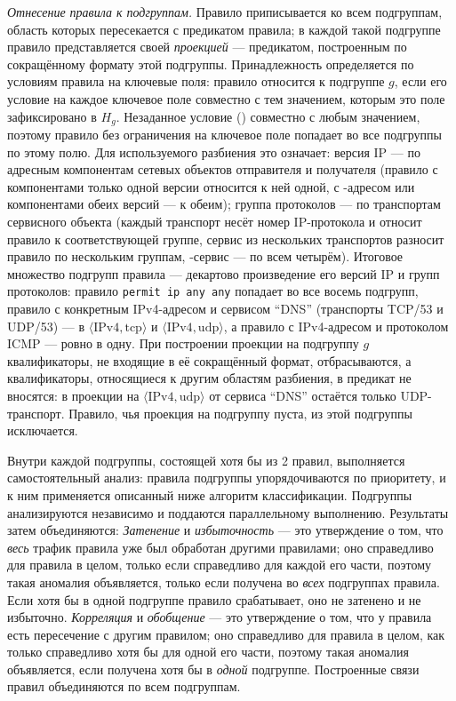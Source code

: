 \emph{Отнесение правила к подгруппам.} Правило приписывается ко всем подгруппам, область которых пересекается с предикатом правила; в каждой такой подгруппе правило представляется своей \emph{проекцией} --- предикатом, построенным по сокращённому формату этой подгруппы. Принадлежность определяется по условиям правила на ключевые поля: правило относится к подгруппе $g$, если его условие на каждое ключевое поле совместно с тем значением, которым это поле зафиксировано в $H_g$. Незаданное условие () совместно с любым значением, поэтому правило без ограничения на ключевое поле попадает во все подгруппы по этому полю. Для используемого разбиения это означает: версия IP --- по адресным компонентам сетевых объектов отправителя и получателя (правило с компонентами только одной версии относится к ней одной, с -адресом или компонентами обеих версий --- к обеим); группа протоколов --- по транспортам сервисного объекта (каждый транспорт несёт номер IP-протокола и относит правило к соответствующей группе, сервис из нескольких транспортов разносит правило по нескольким группам, -сервис --- по всем четырём). Итоговое множество подгрупп правила --- декартово произведение его версий IP и групп протоколов: правило \texttt{permit ip any any} попадает во все восемь подгрупп, правило с конкретным IPv4-адресом и сервисом ``DNS'' (транспорты TCP/53 и UDP/53) --- в $\langle\text{IPv4},\text{tcp}\rangle$ и $\langle\text{IPv4},\text{udp}\rangle$, а правило с IPv4-адресом и протоколом ICMP --- ровно в одну. При построении проекции на подгруппу $g$ квалификаторы, не входящие в её сокращённый формат, отбрасываются, а квалификаторы, относящиеся к другим областям разбиения, в предикат не вносятся: в проекции на $\langle\text{IPv4},\text{udp}\rangle$ от сервиса ``DNS'' остаётся только UDP-транспорт. Правило, чья проекция на подгруппу пуста, из этой подгруппы исключается.

Внутри каждой подгруппы, состоящей хотя бы из 2 правил, выполняется самостоятельный анализ: правила подгруппы упорядочиваются по приоритету, и к ним применяется описанный ниже алгоритм классификации. Подгруппы анализируются независимо и поддаются параллельному выполнению. Результаты затем объединяются: \emph{Затенение} и \emph{избыточность} --- это утверждение о том, что \emph{весь} трафик правила уже был обработан другими правилами; оно справедливо для правила в целом, только если справедливо для каждой его части, поэтому такая аномалия объявляется, только если получена во \emph{всех} подгруппах правила. Если хотя бы в одной подгруппе правило срабатывает, оно не затенено и не избыточно. \emph{Корреляция} и \emph{обобщение} --- это утверждение о том, что у правила есть пересечение с другим правилом; оно справедливо для правила в целом, как только справедливо хотя бы для одной его части, поэтому такая аномалия объявляется, если получена хотя бы в \emph{одной} подгруппе. Построенные связи правил объединяются по всем подгруппам.

